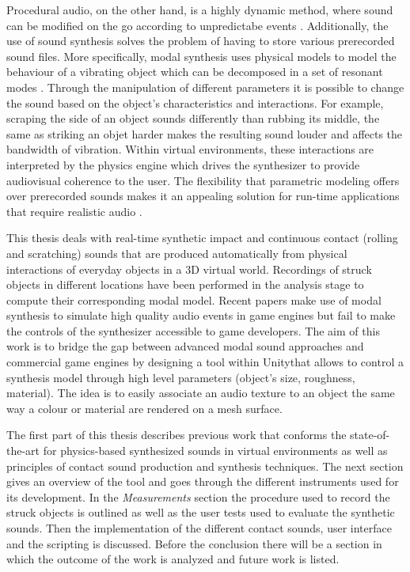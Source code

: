 Procedural audio, on the other hand, is a highly dynamic method, where sound can be modified on the go according to unpredictabe events \cite{farnell2010designing}. Additionally, the use of sound synthesis solves the problem of having to store various prerecorded sound files. More specifically, modal synthesis uses physical models to model the behaviour of a vibrating object which can be decomposed in a set of resonant modes \cite{bilbao2009numerical}. Through the manipulation of different parameters it is possible to change the sound based on the object's characteristics and interactions. For example, scraping the side of an object sounds differently than rubbing its middle, the same as striking an objet harder makes the resulting sound louder and affects the bandwidth of vibration. Within virtual environments, these interactions are interpreted by the physics engine which drives the synthesizer to provide audiovisual coherence to the user.  The flexibility that parametric modeling offers over prerecorded sounds makes it an appealing solution for run-time applications that require realistic audio \cite{Cook:2002:RSS:515316}. 

This thesis deals with real-time synthetic impact and continuous contact (rolling and scratching) sounds that are produced automatically from physical interactions of everyday objects in a 3D virtual world. Recordings of struck objects in different locations have been performed in the analysis stage to compute their corresponding modal model. Recent papers \cite{lloyd2011sound, bonneel2008fast} make use of modal synthesis to simulate high quality audio events in game engines but fail to make the controls of the synthesizer accessible to game developers. The aim of this work is to bridge the gap between advanced modal sound approaches and commercial game engines by designing a tool within Unity\textregistered that allows to control a synthesis model through high level parameters (object's size, roughness, material). The idea is to easily associate an audio texture to an object the same way  a colour or material are rendered on a mesh surface. 

The first part of this thesis describes previous work that conforms the state-of-the-art for physics-based synthesized sounds in virtual environments as well as principles of contact sound production and synthesis techniques. The next section gives an overview of the tool and goes through the different instruments used for its development. In the \textit{Measurements} section the procedure used to record the struck objects is outlined as well as the user tests used to evaluate the synthetic sounds. Then the implementation of the different contact sounds, user interface and the scripting is discussed. Before the conclusion there will be a section in which the outcome of the work is analyzed and future work is listed.

